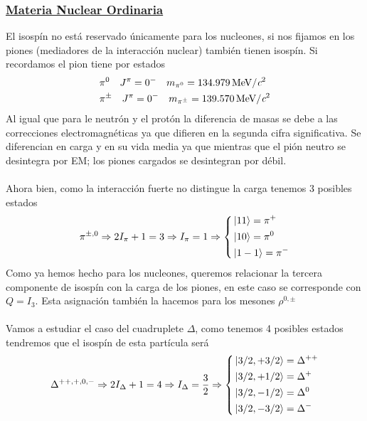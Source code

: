 \subsubsection{\underline{Materia Nuclear Ordinaria}}
El isospín no está reservado únicamente para los nucleones, si nos fijamos en los piones (mediadores de la interacción nuclear) también tienen isospín. Si recordamos el pion tiene por estados 
\begin{equation*}
    \begin{aligned}
        &\pi^0 \quad J^\pi=0^-  \quad m_{\pi^0}=\unit[134.979]{MeV/\textit{c}^2} \\
        &\pi^\pm \quad J^\pi=0^- \quad m_{\pi^\pm}=\unit[139.570]{MeV/\textit{c}^2}
    \end{aligned}
\end{equation*}
Al igual que para le neutrón y el protón la diferencia de masas se debe a las correcciones electromagnéticas ya que difieren en la segunda cifra significativa. Se diferencian en carga y en su vida media ya que mientras que el pión neutro se desintegra por EM; los piones cargados se desintegran por débil.\\\\
Ahora bien, como la interacción fuerte no distingue la carga tenemos 3 posibles estados
\begin{equation*}
    \pi^{\pm,0}\Rightarrow 2I_\pi+1=3\Rightarrow I_\pi=1 \Rightarrow \left \{ \begin{aligned}
        &\ket{11}=\pi^+ \\
        & \ket{10}=\pi^0\\
        &\ket{1-1}=\pi^-
    \end{aligned}\right.
\end{equation*}
Como ya hemos hecho para los nucleones, queremos relacionar la tercera componente de isospín con la carga de los piones, en este caso se corresponde con $Q=I_3$. Esta asignación también la hacemos para los mesones $\rho^{0,\pm}$\\\\
Vamos a estudiar el caso del cuadruplete $\Delta$, como tenemos 4 posibles estados tendremos que el isospín de esta partícula será
\begin{equation*}
    \Delta^{++,+,0,-}\Rightarrow 2I_\Delta+1=4 \Rightarrow I_\Delta=\frac{3}{2} \Rightarrow \left \{ \begin{aligned}
        & \ket{3/2,+3/2}=\Delta^{++} \\
        & \ket{3/2,+1/2}=\Delta^{+}  \\
        & \ket{3/2,-1/2}=\Delta^{0}  \\
        & \ket{3/2,-3/2}=\Delta^{-}  
    \end{aligned}\right.
\end{equation*}

